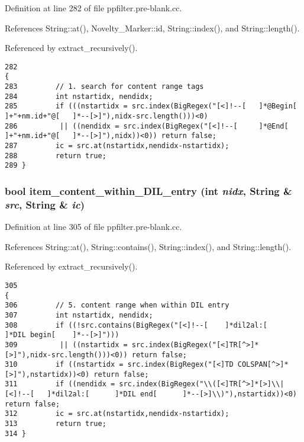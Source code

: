 Definition at line 282 of file ppfilter.pre-blank.cc.

References String::at(), Novelty\_\-Marker::id, String::index(), and String::length().

Referenced by extract\_\-recursively().



\footnotesize\begin{verbatim}282                                                                                                {
283         // 1. search for content range tags
284         int nstartidx, nendidx;
285         if (((nstartidx = src.index(BigRegex("[<]!--[   ]*@Begin[       ]+"+nm.id+"@[   ]*--[>]"),nidx-src.length()))<0)
286          || ((nendidx = src.index(BigRegex("[<]!--[     ]*@End[         ]+"+nm.id+"@[   ]*--[>]"),nidx))<0)) return false;
287         ic = src.at(nstartidx,nendidx-nstartidx);
288         return true;
289 }
\end{verbatim}\normalsize 
{}
\subsubsection{\setlength{\rightskip}{0pt plus 5cm}bool item\_\-content\_\-within\_\-DIL\_\-entry (int {\em nidx}, {\bf String} \& {\em src}, {\bf String} \& {\em ic})}\label{ppfilter_8pre-blank_8cc_a9}




Definition at line 305 of file ppfilter.pre-blank.cc.

References String::at(), String::contains(), String::index(), and String::length().

Referenced by extract\_\-recursively().



\footnotesize\begin{verbatim}305                                                                         {
306         // 5. content range when within DIL entry
307         int nstartidx, nendidx;
308         if ((!src.contains(BigRegex("[<]!--[    ]*dil2al:[      ]*DIL begin[    ]*--[>]")))
309          || ((nstartidx = src.index(BigRegex("[<]TR[^>]*[>]"),nidx-src.length()))<0)) return false;
310         if ((nstartidx = src.index(BigRegex("[<]TD COLSPAN[^>]*[>]"),nstartidx))<0) return false;
311         if ((nendidx = src.index(BigRegex("\\([<]TR[^>]*[>]\\|[<]!--[   ]*dil2al:[      ]*DIL end[      ]*--[>]\\)"),nstartidx))<0) return false;
312         ic = src.at(nstartidx,nendidx-nstartidx);
313         return true;
314 }
\end{verbatim}\normalsize 
{}
